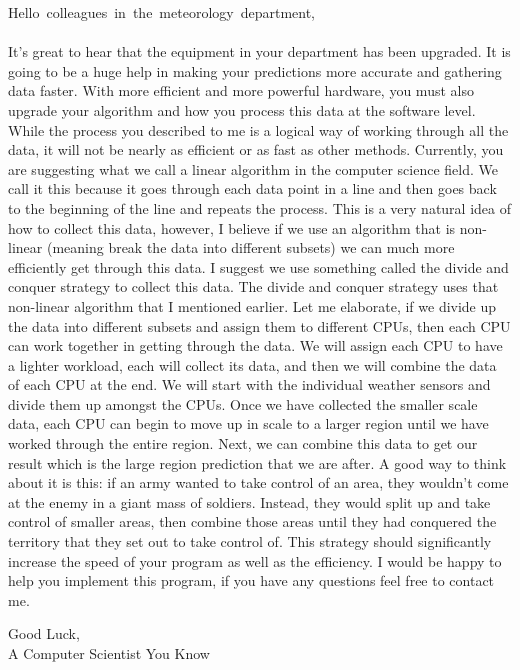 \documentclass[12pt]{article}
\begin{document}
\newpage
\mbox{Hello colleagues in the meteorology department,}
\\ \\ It's great to hear that the equipment in your department has been upgraded. It is going to be a huge help in making your predictions more accurate and gathering data faster. With more efficient and more powerful hardware, you must also upgrade your algorithm and how you process this data at the software level. While the process you described to me is a logical way of working through all the data, it will not be nearly as efficient or as fast as other methods. Currently, you are suggesting what we call a linear algorithm in the computer science field. We call it this because it goes through each data point in a line and then goes back to the beginning of the line and repeats the process. This is a very natural idea of how to collect this data, however, I believe if we use an algorithm that is non-linear (meaning break the data into different subsets) we can much more efficiently get through this data. I suggest we use something called the divide and conquer strategy to collect this data. The divide and conquer strategy uses that non-linear algorithm that I mentioned earlier. Let me elaborate, if we divide up the data into different subsets and assign them to different CPUs, then each CPU can work together in getting through the data. We will assign each CPU to have a lighter workload, each will collect its data, and then we will combine the data of each CPU at the end. We will start with the individual weather sensors and divide them up amongst the CPUs. Once we have collected the smaller scale data, each CPU can begin to move up in scale to a larger region until we have worked through the entire region. Next, we can combine this data to get our result which is the large region prediction that we are after. A good way to think about it is this: if an army wanted to take control of an area, they wouldn't come at the enemy in a giant mass of soldiers. Instead, they would split up and take control of smaller areas, then combine those areas until they had conquered the territory that they set out to take control of. This strategy should significantly increase the speed of your program as well as the efficiency. I would be happy to help you implement this program, if you have any questions feel free to contact me. 

Good Luck,
\\A Computer Scientist You Know
\newpage
\pagebreak
\end{document}
